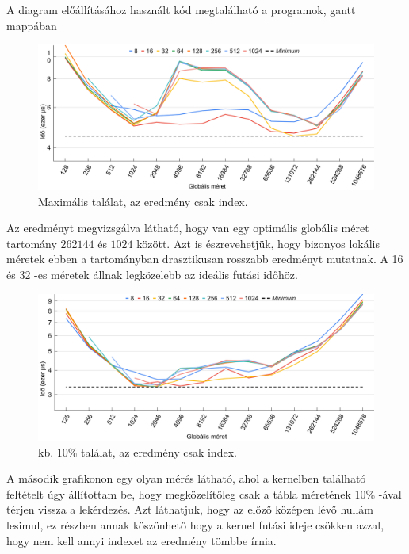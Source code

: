 A diagram előállításához használt kód megtalálható a programok, gantt mappában

\begin{figure}[h!]
\centering
\includegraphics[width=\textwidth]{images/graph/global_size_1.png}
\caption{Maximális találat, az eredmény csak index.}
\label{fig:schema}
\end{figure}

Az eredményt megvizsgálva látható, hogy van egy optimális globális méret tartomány $262144$ és $1024$ között.
Azt is észrevehetjük, hogy bizonyos lokális méretek ebben a tartományban drasztikusan rosszabb eredményt mutatnak.
A 16 és 32 -es méretek állnak legközelebb az ideális futási időhöz.

\begin{figure}[h!]
\centering
\includegraphics[width=\textwidth]{images/graph/global_size_2.png}
\caption{kb. 10\% találat, az eredmény csak index.}
\label{fig:schema}
\end{figure}

A második grafikonon egy olyan mérés látható, ahol a kernelben található feltételt úgy állítottam be, hogy megközelítőleg csak a tábla méretének 10\% -ával térjen vissza a lekérdezés.
Azt láthatjuk, hogy az előző középen lévő hullám lesimul, ez részben annak köszönhető hogy a kernel futási ideje csökken azzal, hogy nem kell annyi indexet az eredmény tömbbe írnia.

